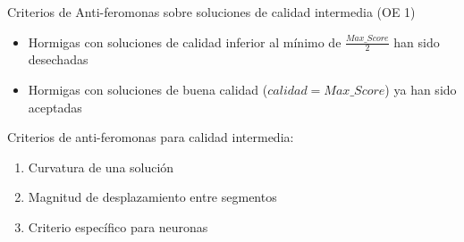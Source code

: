

\begin{frame}{Criterios de Anti-feromonas sobre soluciones de calidad intermedia (OE 1)}
\begin{itemize}
    \item Hormigas con soluciones de calidad inferior al m\'inimo de $\frac{Max\_Score}{2}$ han sido desechadas
    \item Hormigas con soluciones de buena calidad ($calidad = Max\_Score$) ya han sido aceptadas
\end{itemize}
Criterios de anti-feromonas para calidad intermedia:
\begin{enumerate}
    \item Curvatura de una soluci\'on
    \item Magnitud de desplazamiento entre segmentos
    \item Criterio espec\'ifico para neuronas
\end{enumerate}
\end{frame}

